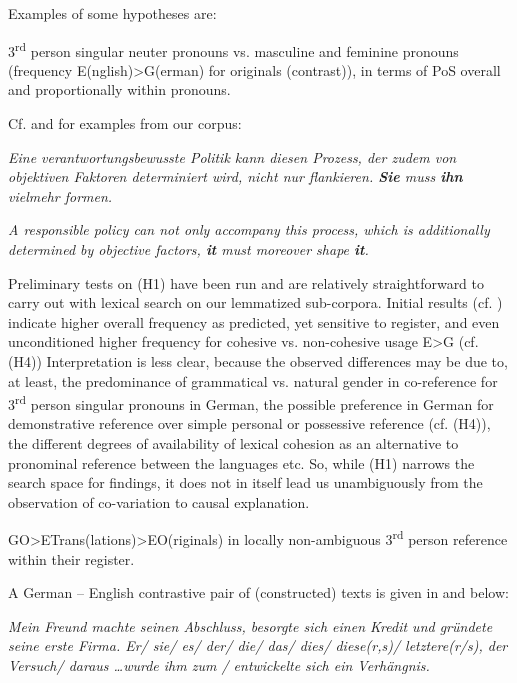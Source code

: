 \documentclass[output=paper]{LSP/langsci}
\begin{document}
Examples of some hypotheses are:
\begin{exe} \label{hyp:steiner:1}
3\textsuperscript{rd} person singular neuter pronouns vs. masculine and feminine pronouns (frequency E(nglish){\textgreater}G(erman) for originals (contrast)), in terms of PoS overall and proportionally within pronouns. 
\z

Cf.  and  for examples from our corpus:

\ea\label{ex:steiner:1}
\textit{Eine verantwortungsbewusste Politik kann diesen Prozess, der zudem von objektiven Faktoren determiniert wird, nicht nur flankieren. \textbf{Sie} muss \textbf{ihn} vielmehr formen.}
\z

\ea\label{ex:steiner:2}
\textit{A responsible policy can not only accompany this process, which is additionally determined by objective factors, \textbf{it} must moreover shape \textbf{it}.}
\z

Preliminary tests on {(H1)} have been run and are relatively straightforward to carry out with lexical search on our lemmatized sub-corpora. Initial results (cf. \citealt{Kunzfc}) indicate higher overall frequency as predicted, yet sensitive to register, and even unconditioned higher frequency for cohesive vs. non-cohesive usage E{\textgreater}G %
(cf. {(H4)})
Interpretation is less clear, because the observed differences may be due to, at least, the predominance of grammatical vs. natural gender in co-reference for 3\textsuperscript{rd} person singular pronouns in German, the possible preference in German for demonstrative reference over simple personal or possessive reference 
(cf. {(H4)}), the different degrees of availability of lexical cohesion as an alternative to pronominal reference between the languages etc. So, while {(H1)} narrows the search space for findings, it does not in itself lead us unambiguously from the observation of co-variation to causal explanation. 

\begin{exe}\label{hyp:steiner:2} 
GO{\textgreater}ETrans(lations){\textgreater}EO(riginals) in locally non-ambiguous 3\textsuperscript{rd} person reference within their register.
\z

A German -- English contrastive pair of (constructed) texts is given in  and  below:

\ea\label{ex:steiner:3}
\textit{Mein Freund machte seinen Abschluss, besorgte sich einen Kredit und gründete seine erste Firma. Er/ sie/ es/ der/ die/ das/ dies/ diese(r,s)/ letztere(r/s), der Versuch/ daraus \ldots wurde ihm zum / entwickelte sich ein Verhängnis.}
\z


\end{exe}
\end{exe}
\end{document}
